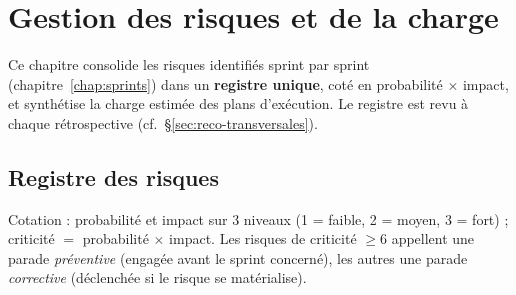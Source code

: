 \chapter{Gestion des risques et de la charge}
\label{chap:risques}

Ce chapitre consolide les risques identifiés sprint par sprint
(chapitre~\ref{chap:sprints}) dans un \textbf{registre unique}, coté en
probabilité $\times$ impact, et synthétise la charge estimée des plans
d'exécution. Le registre est revu à chaque rétrospective
(cf.~§\ref{sec:reco-transversales}).

\section{Registre des risques}

Cotation : probabilité et impact sur 3 niveaux (1 = faible, 2 = moyen,
3 = fort) ; criticité $=$ probabilité $\times$ impact. Les risques de
criticité $\geq 6$ appellent une parade \emph{préventive} (engagée avant le
sprint concerné), les autres une parade \emph{corrective} (déclenchée si le
risque se matérialise).

